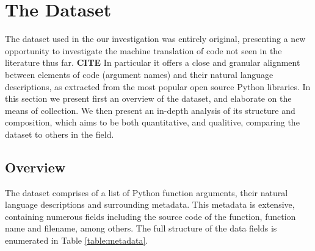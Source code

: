 \chapter{The Dataset}
\label{the_dataset}



The dataset used in the our investigation was entirely original, presenting a new opportunity to investigate the machine translation of code not seen in the literature thus far. \textbf{CITE}
In particular it offers a close and granular alignment between elements of code (argument names) and their natural language descriptions, as extracted from the most popular open source Python libraries.
In this section we present first an overview of the dataset, and elaborate on  the means of collection. 
We then present an in-depth analysis of its structure and composition, which aims to be both quantitative, and qualitive, comparing the dataset to others in the field. 

\section{Overview} %
\label{sec:overview}

The dataset comprises of a list of Python function arguments, their natural language descriptions and surrounding metadata. 
This metadata is extensive, containing numerous fields including the source code of the function, function name and filename, among others. 
The full structure of the data fields is enumerated in Table \ref{table:metadata}. 

